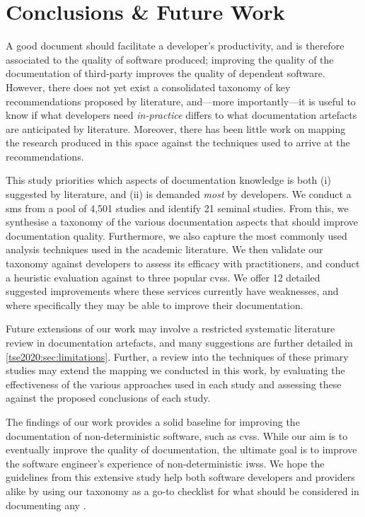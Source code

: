 \section{Conclusions \& Future Work}
\label{tse2020:sec:conclusions}

A good  document should facilitate a developer's productivity, and is therefore associated to the quality of software produced; improving the quality of the documentation of third-party  improves the quality of dependent software.
However, there does not yet exist a consolidated taxonomy of key recommendations proposed by literature, and---more importantly---it is useful to know if what developers need \textit{in-practice} differs to what documentation artefacts are anticipated by literature. Moreover, there has been little work on mapping the research produced in this space against the techniques used to arrive at the recommendations.

This study priorities which aspects of  documentation knowledge is both (i) suggested by literature, and (ii) is demanded \textit{most} by developers.
We conduct a \gls{sms} from a pool of 4,501 studies and identify 21 seminal studies. From this, we synthesise a taxonomy of the various documentation aspects that should improve  documentation quality. Furthermore, we also capture the most commonly used analysis techniques used in the academic literature. We then validate our taxonomy against developers to assess its efficacy with practitioners, and conduct a heuristic evaluation against to three popular \glspl{cvs}. We offer 12 detailed suggested improvements where these services currently have weaknesses, and where specifically they may be able to improve their documentation.

Future extensions of our work may involve a restricted systematic literature review in  documentation artefacts, and many suggestions are further detailed in \cref{tse2020:sec:limitations}. Further, a review into the techniques of these primary studies may extend the mapping we conducted in this work, by evaluating the effectiveness of the various approaches used in each study and assessing these against the proposed conclusions of each study.

The findings of our work provides a solid baseline for improving the documentation of non-deterministic software, such as \glspl{cvs}. While our aim is to eventually improve the quality of  documentation, the ultimate goal is to improve the software engineer's experience of non-deterministic \glspl{iws}. We hope the guidelines from this extensive study help both software developers and  providers alike by using our taxonomy as a go-to checklist for what should be considered in documenting any .